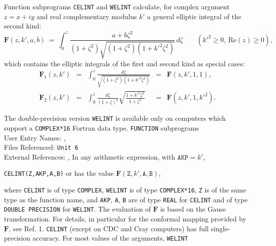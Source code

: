                       
                  
\Submitter{}                           
                      \Revised{}
Function subprograms {\tt CELINT} and {\tt WELINT} calculate, for complex
argument $z=x+iy$ and real complementary modulus $k'$ a general
elliptic integral of the second kind:
$$ \mathbf{F}(z,k',a,b) \ = \ \displaystyle
\int_0^z \frac{a+b\zeta^2}{(1+\zeta^2)
\sqrt{(1+\zeta^2)(1+{k'}^2\zeta^2)}} \, d\zeta
\qquad ({k'}^2 \geq 0, \ \mathrm{Re}(z) \geq 0), $$
which contains the elliptic integrals of the first and second kind as
special cases:
$$ \begin{array}{rclcl}
\mathbf{F}_1(z,k') & = & \displaystyle \int_0^z \frac{d\zeta}
{\sqrt{(1+\zeta^2)(1+{k'}^2 \zeta^2)}} & = & \mathbf{F}(z,k',1,1),\\[6mm]
\mathbf{F}_2(z,k') & = & \displaystyle \int_0^z \frac{d\zeta}
{(1+\zeta)^2} \sqrt{\frac{1+{k'}^2 \zeta^2}{1+\zeta^2}} & = &
\mathbf{F}(z,k',1,{k'}^2).
\end{array} $$
\par
The double-precision version {\tt WELINT} is available only on computers
which support a {\tt COMPLEX*16} Fortran data type.
\Structure
{\tt FUNCTION} subprograms \\
User Entry Names: ,  \\
Files Referenced: {\tt Unit 6} \\
External References: , 
\Usage
In any arithmetic expression, with $\mathtt{AKP}=k'$,
\begin{center}
{\tt CELINT(Z,AKP,A,B)} \quad or  \quad
has the value \quad $\mathbf{F}(\mathtt{Z},k',\mathtt{A,B})$,
\end{center}
where {\tt CELINT} is of type {\tt COMPLEX}, {\tt WELINT} is of type
{\tt COMPLEX*16}, {\tt Z} is of the same type as the function name,
and {\tt AKP}, {\tt A}, {\tt B} are of type {\tt REAL} for {\tt CELINT}
and of type {\tt DOUBLE PRECISION} for {\tt WELINT}.
\Method
The evaluation of $\mathbf{F}$ is based on the Gauss transformation.
For details, in particular for the conformal mapping provided by
$\mathbf{F}$, see Ref. 1.
\Accuracy
{\tt CELINT} (except on CDC and Cray computers)
has full single-precision accuracy.
For most values of the arguments, {\tt WELINT}
